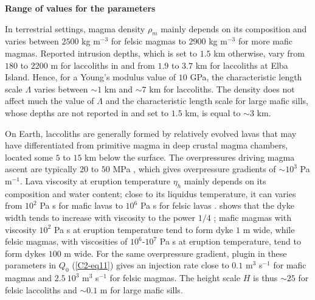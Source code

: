 \vspace{.5cm}   \textbf{Range   of    values   for   the   parameters}
\vspace{.5cm}

In terrestrial settings, magma density  $\rho_m$ mainly depends on its
composition and varies  between $ 2500$ kg m$^{-3}$  for felsic magmas
to  $2900$ kg  m$^{-3}$  for more  mafic  magmas.  Reported  intrusion
depths, which is set to $1.5$  km otherwise, vary from $180$ to $2200$
m for  laccoliths in \citet{E:2015tl} and  from $1.9$ to $3.7$  km for
laccoliths at Elba Island.  Hence, for a Young's modulus value of $10$
GPa, the characteristic length scale $\Lambda$ varies between $\sim 1$
km and $\sim  7$ km for laccoliths.  The density  does not affect much
the value of  $\Lambda$ and the characteristic length  scale for large
mafic sills,  whose depths are  not reported in  \citet{Cruden:tg} and
set to $1.5$ km, is equal to $\sim 3$ km.

On Earth, laccoliths are generally  formed by relatively evolved lavas
that  may have  differentiated from  primitive magma  in deep  crustal
magma chambers,  located some $5$  to $15$  km below the  surface. The
overpressures  driving magma  ascent are  typically $20$  to $50$  MPa
\citep{Stasiuk:1993kg,Barmin:2002ea},    which   gives    overpressure
gradients  of $\sim  10^3$ Pa  m$^{-1}$.  Lava  viscosity at  eruption
temperature  $\eta_h$  mainly depends  on  its  composition and  water
content; close to its liquidus  temperature, it can varies from $10^2$
Pa  s   for  mafic   lavas  to   $10^{6}$  Pa   s  for   felsic  lavas
\citep{Anonymous:CZVBrBvv,Giordano:2008em,Whittington:2009fv,Chevrel:2013jn}.
\citet{Wada:2007tv} shows that  the dyke width tends  to increase with
viscosity to  the power  $1/4$ \citep{Kerr:1995tl}; mafic  magmas with
viscosity $10^2$ Pa s at eruption  temperature tend to form dyke $1$ m
wide, while felsic  magmas, with viscosities of $10^6$-$10^7$  Pa s at
eruption temperature, tend  to form dykes $100$ m wide.   For the same
overpressure   gradient,  plugin   in   these   parameters  in   $Q_0$
(\ref{C2-eq11}) gives an injection rate  close to $0.1$ m$^3$ s$^{-1}$
for mafic magmas and $2.5~10^3$  m$^3$ s$^{-1}$ for felsic magmas. The
height  scale  $H$  is  thus  $\sim  25$  for  felsic  laccoliths  and
$\sim 0.1$ m for large mafic sills.

